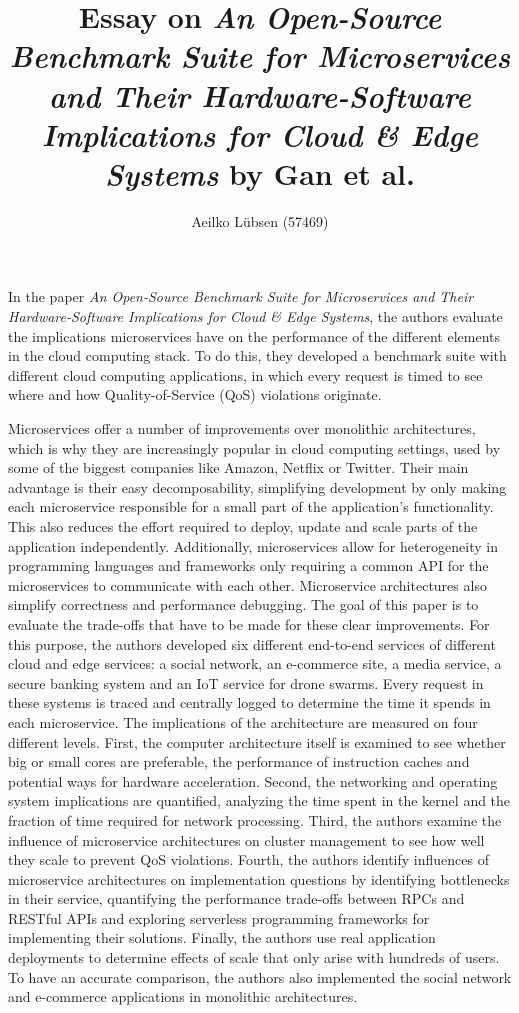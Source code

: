 \documentclass[10pt]{article}
\title{Essay on \textit{An Open-Source Benchmark Suite for Microservices and Their Hardware-Software Implications for Cloud \& Edge Systems} by Gan et al.}
\author{Aeilko Lübsen (57469)}
\begin{document}
	
	\maketitle
	
	In the paper \textit{An Open-Source Benchmark Suite for Microservices and Their Hardware-Software Implications for Cloud \& Edge Systems}, the authors evaluate the implications microservices have on the performance of the different elements in the cloud computing stack. To do this, they developed a benchmark suite with different cloud computing applications, in which every request is timed to see where and how Quality-of-Service (QoS) violations originate.
	
	Microservices offer a number of improvements over monolithic architectures, which is why they are increasingly popular in cloud computing settings, used by some of the biggest companies like Amazon, Netflix or Twitter. Their main advantage is their easy decomposability, simplifying development by only making each microservice responsible for a small part of the application's functionality. This also reduces the effort required to deploy, update and scale parts of the application independently. Additionally, microservices allow for heterogeneity in programming languages and frameworks only requiring a common API for the microservices to communicate with each other. Microservice architectures also simplify correctness and performance debugging. The goal of this paper is to evaluate the trade-offs that have to be made for these clear improvements. For this purpose, the authors developed six different end-to-end services of different cloud and edge services: a social network, an e-commerce site, a media service, a secure banking system and an IoT service for drone swarms. Every request in these systems is traced and centrally logged to determine the time it spends in each microservice. The implications of the architecture are measured on four different levels. First, the computer architecture itself is examined to see whether big or small cores are preferable, the performance of instruction caches and potential ways for hardware acceleration. Second, the networking and operating system implications are quantified, analyzing the time spent in the kernel and the fraction of time required for network processing. Third, the authors examine the influence of microservice architectures on cluster management to see how well they scale to prevent QoS violations. Fourth, the authors identify influences of microservice architectures on implementation questions by identifying bottlenecks in their service, quantifying the performance trade-offs between RPCs and RESTful APIs and exploring serverless programming frameworks for implementing their solutions. Finally, the authors use real application deployments to determine effects of scale that only arise with hundreds of users. To have an accurate comparison, the authors also implemented the social network and e-commerce applications in monolithic architectures.
	
\end{document}
